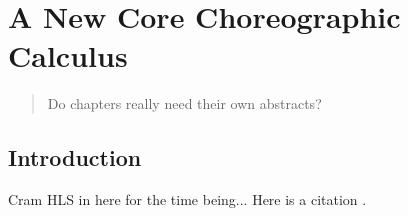 \chapter{A New Core Choreographic Calculus}
\label{sec:formalism}

\begin{quote}
Do chapters really need their own abstracts?
\end{quote}


\section{Introduction}
Cram HLS in here for the time being...
Here is a citation .



